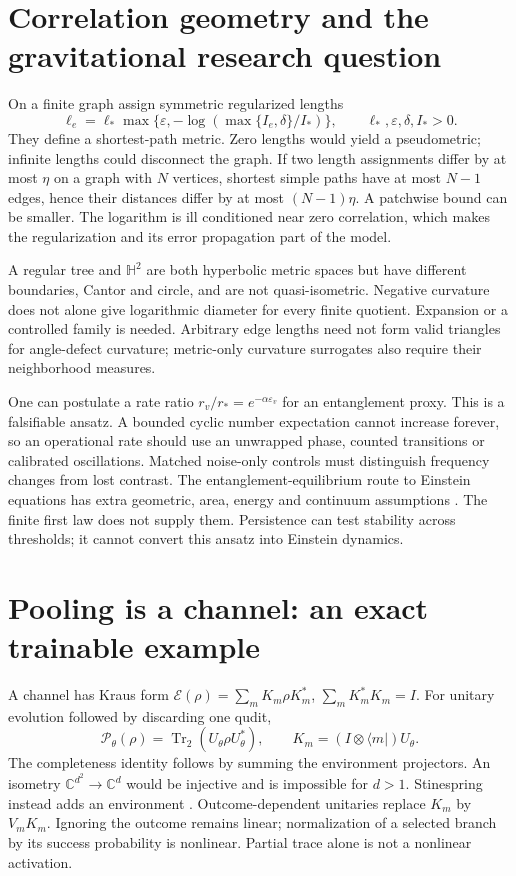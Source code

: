 \documentclass[11pt,oneside,openany]{book}
\theoremstyle{definition}\newtheorem{definition}[theorem]{Definition}
\theoremstyle{remark}\newtheorem{remark}[theorem]{Remark}
\newcommand{\C}{\mathbb C}\newcommand{\Z}{\mathbb Z}\newcommand{\R}{\mathbb R}
\begin{document}
\section{Correlation geometry and the gravitational research question}
On a finite graph assign symmetric regularized lengths
\[
 \ell_e=\ell_*\max\{\varepsilon,
 -\log(\max\{I_e,\delta\}/I_*)\},\qquad
 \ell_*,\varepsilon,\delta,I_*>0.
\]
They define a shortest-path metric. Zero lengths would yield a pseudometric;
infinite lengths could disconnect the graph. If two length assignments
differ by at most $\eta$ on a graph with $N$ vertices, shortest simple
paths have at most $N-1$ edges, hence their distances differ by at most
$(N-1)\eta$. A patchwise bound can be smaller. The logarithm is ill
conditioned near zero correlation, which makes the regularization and its
error propagation part of the model.

A regular tree and $\mathbb H^2$ are both hyperbolic metric spaces but
have different boundaries, Cantor and circle, and are not quasi-isometric.
Negative curvature does not alone give logarithmic diameter for every
finite quotient. Expansion or a controlled family is needed. Arbitrary
edge lengths need not form valid triangles for angle-defect curvature;
metric-only curvature surrogates also require their neighborhood measures.

One can postulate a rate ratio $r_v/r_*=e^{-\alpha\varepsilon_v}$ for
an entanglement proxy. This is a falsifiable ansatz. A bounded cyclic number
expectation cannot increase forever, so an operational rate should use an
unwrapped phase, counted transitions or calibrated oscillations. Matched
noise-only controls must distinguish frequency changes from lost contrast.
The entanglement-equilibrium route to Einstein equations has extra geometric,
area, energy and continuum assumptions \cite{PhysJacobson}. The finite
first law does not supply them. Persistence can test stability across
thresholds; it cannot convert this ansatz into Einstein dynamics.

\section{Pooling is a channel: an exact trainable example}
A channel has Kraus form $\mathcal E(\rho)=\sum_mK_m\rho K_m^*$,
$\sum_mK_m^*K_m=I$. For unitary evolution followed by discarding one qudit,
\[
 \mathcal P_\theta(\rho)=\operatorname{Tr}_2(U_\theta\rho U_\theta^*),
 \qquad K_m=(I\otimes\langle m|)U_\theta.
\]
The completeness identity follows by summing the environment projectors.
An isometry $\C^{d^2}\to\C^d$ would be injective and is impossible for
$d>1$. Stinespring instead adds an environment \cite{PhysStinespring}.
Outcome-dependent unitaries replace $K_m$ by $V_mK_m$. Ignoring the outcome
remains linear; normalization of a selected branch by its success probability
is nonlinear. Partial trace alone is not a nonlinear activation.
\end{document}
